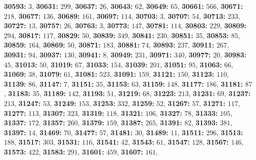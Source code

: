 \textsf{\bfseries 30593:} $3$, \textsf{\bfseries 30631:} $299$, \textsf{\bfseries 30637:} $26$, \textsf{\bfseries 30643:} $62$, \textsf{\bfseries 30649:} $65$, \textsf{\bfseries 30661:} $566$, \textsf{\bfseries 30671:} $218$, \textsf{\bfseries 30677:} $136$, \textsf{\bfseries 30689:} $161$, \textsf{\bfseries 30697:} $114$, \textsf{\bfseries 30703:} $3$, \textsf{\bfseries 30707:} $54$, \textsf{\bfseries 30713:} $233$, \textsf{\bfseries 30727:} $13$, \textsf{\bfseries 30757:} $26$, \textsf{\bfseries 30763:} $3$, \textsf{\bfseries 30773:} $147$, \textsf{\bfseries 30781:} $114$, \textsf{\bfseries 30803:} $229$, \textsf{\bfseries 30809:} $294$, \textsf{\bfseries 30817:} $117$, \textsf{\bfseries 30829:} $50$, \textsf{\bfseries 30839:} $349$, \textsf{\bfseries 30841:} $230$, \textsf{\bfseries 30851:} $35$, \textsf{\bfseries 30853:} $85$, \textsf{\bfseries 30859:} $164$, \textsf{\bfseries 30869:} $50$, \textsf{\bfseries 30871:} $183$, \textsf{\bfseries 30881:} $74$, \textsf{\bfseries 30893:} $237$, \textsf{\bfseries 30911:} $267$, \textsf{\bfseries 30931:} $94$, \textsf{\bfseries 30937:} $130$, \textsf{\bfseries 30941:} $8$, \textsf{\bfseries 30949:} $231$, \textsf{\bfseries 30971:} $340$, \textsf{\bfseries 30977:} $20$, \textsf{\bfseries 30983:} $45$, \textsf{\bfseries 31013:} $50$, \textsf{\bfseries 31019:} $67$, \textsf{\bfseries 31033:} $154$, \textsf{\bfseries 31039:} $201$, \textsf{\bfseries 31051:} $95$, \textsf{\bfseries 31063:} $66$, \textsf{\bfseries 31069:} $38$, \textsf{\bfseries 31079:} $61$, \textsf{\bfseries 31081:} $523$, \textsf{\bfseries 31091:} $159$, \textsf{\bfseries 31121:} $150$, \textsf{\bfseries 31123:} $110$, \textsf{\bfseries 31139:} $86$, \textsf{\bfseries 31147:} $7$, \textsf{\bfseries 31151:} $35$, \textsf{\bfseries 31153:} $63$, \textsf{\bfseries 31159:} $148$, \textsf{\bfseries 31177:} $186$, \textsf{\bfseries 31181:} $87$, \textsf{\bfseries 31183:} $35$, \textsf{\bfseries 31189:} $142$, \textsf{\bfseries 31193:} $51$, \textsf{\bfseries 31219:} $68$, \textsf{\bfseries 31223:} $213$, \textsf{\bfseries 31231:} $69$, \textsf{\bfseries 31237:} $213$, \textsf{\bfseries 31247:} $53$, \textsf{\bfseries 31249:} $153$, \textsf{\bfseries 31253:} $332$, \textsf{\bfseries 31259:} $52$, \textsf{\bfseries 31267:} $57$, \textsf{\bfseries 31271:} $117$, \textsf{\bfseries 31277:} $113$, \textsf{\bfseries 31307:} $323$, \textsf{\bfseries 31319:} $118$, \textsf{\bfseries 31321:} $106$, \textsf{\bfseries 31327:} $78$, \textsf{\bfseries 31333:} $105$, \textsf{\bfseries 31337:} $172$, \textsf{\bfseries 31357:} $260$, \textsf{\bfseries 31379:} $159$, \textsf{\bfseries 31387:} $265$, \textsf{\bfseries 31391:} $82$, \textsf{\bfseries 31393:} $381$, \textsf{\bfseries 31397:} $14$, \textsf{\bfseries 31469:} $70$, \textsf{\bfseries 31477:} $57$, \textsf{\bfseries 31481:} $30$, \textsf{\bfseries 31489:} $11$, \textsf{\bfseries 31511:} $296$, \textsf{\bfseries 31513:} $188$, \textsf{\bfseries 31517:} $303$, \textsf{\bfseries 31531:} $116$, \textsf{\bfseries 31541:} $42$, \textsf{\bfseries 31543:} $61$, \textsf{\bfseries 31547:} $128$, \textsf{\bfseries 31567:} $146$, \textsf{\bfseries 31573:} $422$, \textsf{\bfseries 31583:} $291$, \textsf{\bfseries 31601:} $459$, \textsf{\bfseries 31607:} $161$, 

